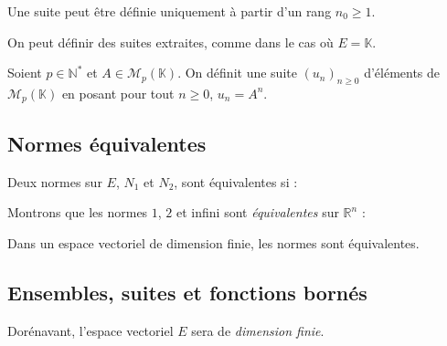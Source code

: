 \documentclass[a4paper,10pt]{report}
\begin{document}
\begin{rems} 
\item Une suite peut être définie uniquement à partir d'un rang $n_0 \geq 1$.
\item On peut définir des suites extraites, comme dans le cas où $E = \mathbb{K}$.
\end{rems}

\medskip

\begin{ex} Soient $p \in \mathbb{N}^{*}$ et $A \in \mathcal{M}_p(\mathbb{K})$. On définit une suite $(u_n)_{n \geq 0}$ d'éléments de $\mathcal{M}_p(\mathbb{K})$ en posant pour tout $n \geq 0$, $u_n = A^n$. 
\end{ex}

\subsection{Normes équivalentes}

\begin{defin} Deux normes sur $E$, $N_1$ et $N_2$, sont équivalentes si :

\vspace{1cm}
\end{defin}

\begin{ex} Montrons que les normes $1$, $2$ et infini sont \textit{équivalentes} sur $\mathbb{R}^n$ :

\vspace{7cm}
\end{ex}

\begin{thm}[Admis] Dans un espace vectoriel de dimension finie, les normes sont équivalentes.
\end{thm}

\subsection{Ensembles, suites et fonctions bornés}

\noindent Dorénavant, l'espace vectoriel $E$ sera de \textit{dimension finie}.
\end{document}
